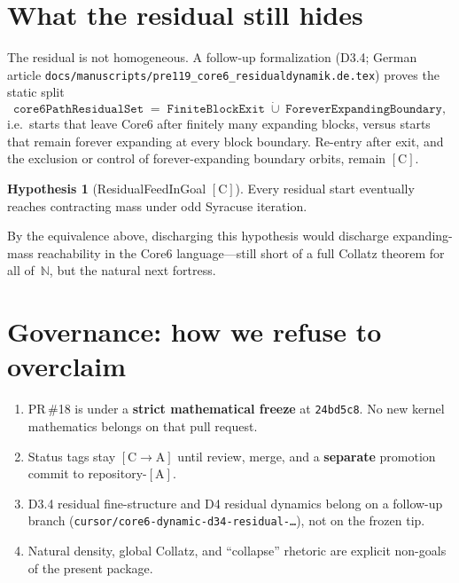 \documentclass[11pt,a4paper]{article}
\theoremstyle{definition}
\newtheorem{hypothesis}[theorem]{Hypothesis}
\theoremstyle{remark}
\newcommand{\CA}{\ensuremath{[\mathrm{C}\!\to\!\mathrm{A}]}}
\newcommand{\tagA}{\ensuremath{[\mathrm{A}]}}
\newcommand{\tagC}{\ensuremath{[\mathrm{C}]}}
\newcommand{\Residual}{\mathtt{core6PathResidualSet}}
\begin{document}
\section{What the residual still hides}

The residual is not homogeneous.
A follow-up formalization (D3.4; German article
\texttt{docs/manuscripts/pre119\_core6\_residualdynamik.de.tex}) proves the
static split
\[
  \Residual
  \;=\;
  \mathtt{FiniteBlockExit}
  \;\dot\cup\;
  \mathtt{ForeverExpandingBoundary},
\]
i.e.\ starts that leave Core6 after finitely many expanding blocks, versus
starts that remain forever expanding at every block boundary.
Re-entry after exit, and the exclusion or control of forever-expanding
boundary orbits, remain \tagC.

\begin{hypothesis}[ResidualFeedInGoal \tagC]
Every residual start eventually reaches contracting mass under odd Syracuse
iteration.
\end{hypothesis}
By the equivalence above, discharging this hypothesis would discharge
expanding-mass reachability in the Core6 language---still short of a full
Collatz theorem for all of~$\mathbb{N}$, but the natural next fortress.

\section{Governance: how we refuse to overclaim}

\begin{enumerate}[leftmargin=*]
  \item PR\,\#18 is under a \textbf{strict mathematical freeze} at
  \texttt{24bd5c8}. No new kernel mathematics belongs on that pull request.
  \item Status tags stay \CA{} until review, merge, and a \textbf{separate}
  promotion commit to repository-\tagA.
  \item D3.4 residual fine-structure and D4 residual dynamics belong on a
  follow-up branch
  (\texttt{cursor/core6-dynamic-d34-residual-\ldots}), not on the frozen tip.
  \item Natural density, global Collatz, and ``collapse'' rhetoric are
  explicit non-goals of the present package.
\end{enumerate}
\end{document}
